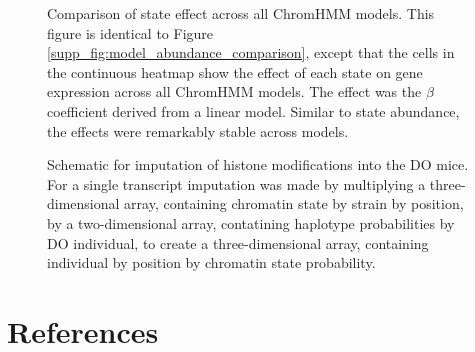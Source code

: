 \documentclass[10pt,letterpaper]{article}
\begin{document}
\begin{figure}[ht]
\centering
\caption{Comparison of state effect across all ChromHMM models. This figure is 
identical to Figure \ref{supp_fig:model_abundance_comparison}, except that the
cells in the continuous heatmap show the effect of each state on gene expression
across all ChromHMM models. The effect was the $\beta$ coefficient derived from
a linear model. Similar to state abundance, the effects were remarkably stable
across models.}
\label{supp_fig:model_effect_comparison}
\end{figure}

\begin{figure}[ht]
\centering
\caption{Schematic for imputation of histone modifications into the 
DO mice. For a single transcript imputation was made by multiplying 
a three-dimensional array, containing chromatin state by strain by
position, by a two-dimensional array, contatining haplotype probabilities
by DO individual, to create a three-dimensional array, containing 
individual by position by chromatin state probability.}
\label{supp_fig:imputation}
\end{figure}

\hypertarget{references}{%
\section*{References}\label{references}}

\nolinenumbers
\end{document}
